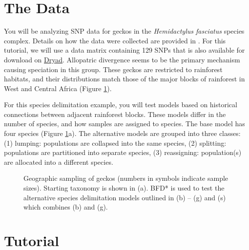 \documentclass{article}
\begin{document}
\section{The Data}
You will be analyzing SNP data for geckos in the \textit{Hemidactylus fasciatus} species complex. Details on how the data were collected are 
provided in \citep{Leache14}. For this tutorial, we will use a data matrix containing 129 SNPs that is also available for download on \href{http://datadryad.org/resource/doi:10.5061/dryad.r55fb}{Dryad}. Allopatric divergence seems to be the primary mechanism causing speciation in this group. These geckos are restricted to rainforest habitats, and their distributions match those of the major blocks of rainforest in West and Central Africa (Figure \ref{fig:map}). 

For this species delimitation example, you will test models based on historical connections between adjacent rainforest blocks. These models differ in the number of species, and how samples are assigned to species. The base model has four species (Figure \ref{fig:map}a). The alternative models are grouped into three classes: (1) lumping: populations are collapsed into the same species, (2) splitting: populations are partitioned into separate species, (3) reassigning: population(s) are allocated into a different species.

    \begin{figure}[htbp]
        \centering
        \caption{Geographic sampling of geckos (numbers in symbols indicate sample sizes). Starting taxonomy is shown in (a). BFD* is used to test the alternative species delimitation models outlined in (b) -- (g)
        and (s) which combines (b) and (g).}
        \label{fig:map}
    \end{figure}

\section{Tutorial}
\newcommand{\step}[2]{\addtocounter{stepCounter}{1} {\bf \hypertarget{step\arabic{stepCounter}}{Step \arabic{stepCounter}:}}\xspace #2\par}
\newcommand{\intermediate}[1]{#1}

\end{document}
